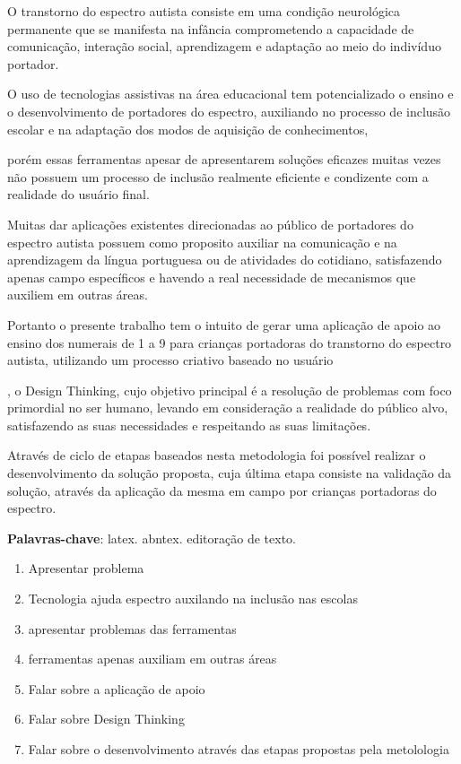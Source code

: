 \setlength{\absparsep}{18pt} %
\begin{resumo}
	O transtorno do espectro autista consiste em uma condição neurológica permanente que se manifesta na infância comprometendo a capacidade de comunicação, interação social, aprendizagem e adaptação ao meio do indivíduo portador. 

	O uso de tecnologias assistivas na área educacional tem potencializado o ensino e o desenvolvimento de portadores do espectro, auxiliando no processo de inclusão escolar e na adaptação dos modos de aquisição de conhecimentos, 

	porém essas ferramentas apesar de apresentarem soluções eficazes muitas vezes não possuem um processo de inclusão realmente eficiente e condizente com a realidade do usuário final. 

	Muitas dar aplicações existentes direcionadas ao público de portadores do espectro autista possuem como proposito auxiliar na comunicação e na aprendizagem da língua portuguesa ou de atividades do cotidiano, satisfazendo apenas campo específicos e havendo a real necessidade de mecanismos que auxiliem em outras áreas.

	Portanto o presente trabalho tem o intuito de gerar uma aplicação de apoio ao ensino dos numerais de 1 a 9 para crianças portadoras do transtorno do espectro autista, utilizando um processo criativo baseado no usuário

	, o Design Thinking, cujo objetivo principal é a resolução de problemas com foco primordial no ser humano, levando em consideração a realidade do público alvo, satisfazendo as suas necessidades e respeitando as suas limitações.  

	Através de ciclo de etapas baseados nesta metodologia foi possível realizar o desenvolvimento da solução proposta, cuja última etapa consiste na validação da solução, através da aplicação da mesma em campo por crianças portadoras do espectro.

	\textbf{Palavras-chave}: latex. abntex. editoração de texto.
	\newpage
	\begin{enumerate}
		\item Apresentar problema
		\item Tecnologia ajuda espectro auxilando na inclusão nas escolas
		\item apresentar problemas das ferramentas
		\item ferramentas apenas auxiliam em outras áreas
		\item Falar sobre a aplicação de apoio
		\item Falar sobre Design Thinking
		\item Falar sobre o desenvolvimento através das etapas propostas pela metolologia
	\end{enumerate}



\end{resumo}
